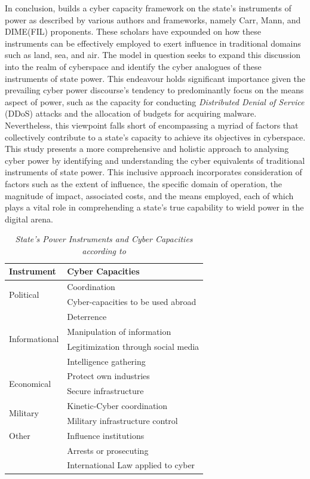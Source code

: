 In conclusion, \textcite{vanhaaster_2016_assessing} builds a cyber capacity framework on the state’s instruments of power as described by various authors and frameworks, namely Carr, Mann, and DIME(FIL) proponents.  These scholars have expounded on how these instruments can be effectively employed to exert influence in traditional domains such as land, sea, and air. The model in question seeks to expand this discussion into the realm of cyberspace and identify the cyber analogues of these instruments of state power. This endeavour holds significant importance given the prevailing cyber power discourse's tendency to predominantly focus on the means aspect of power, such as the capacity for conducting \textit{Distributed Denial of Service} (DDoS) attacks and the allocation of budgets for acquiring malware. Nevertheless, this viewpoint falls short of encompassing a myriad of factors that collectively contribute to a state's capacity to achieve its objectives in cyberspace. This study presents a more comprehensive and holistic approach to analysing cyber power by identifying and understanding the cyber equivalents of traditional instruments of state power. This inclusive approach incorporates consideration of factors such as the extent of influence, the specific domain of operation, the magnitude of impact, associated costs, and the means employed, each of which plays a vital role in comprehending a state's true capability to wield power in the digital arena. 

\begin{table}[htbp]
  \centering
  \caption{\emph{State's Power Instruments and Cyber Capacities according to \textcite{vanhaaster_2016_assessing}}}
  \begin{tabularx}{\textwidth}{p{2.5cm}X}
    \toprule
    \textbf{Instrument} & \textbf{Cyber Capacities} \\
    \midrule
    \multirow{2}{*}{Political} & Coordination \\
    & Cyber-capacities to be used abroad \\
    & Deterrence \\
    \midrule
    \multirow{2}{*}{Informational} & Manipulation of information \\
    & Legitimization through social media \\
    & Intelligence gathering \\
    \midrule
    \multirow{2}{*}{Economical} & Protect own industries \\
    & Secure infrastructure \\
    \midrule
    \multirow{2}{*}{Military} & Kinetic-Cyber coordination \\
    & Military infrastructure control \\
    \midrule
    Other & Influence institutions \\
    & Arrests or prosecuting \\
    & International Law applied to cyber \\
    \bottomrule
  \end{tabularx}
  \label{tab:state-power-cyber}
\end{table}





